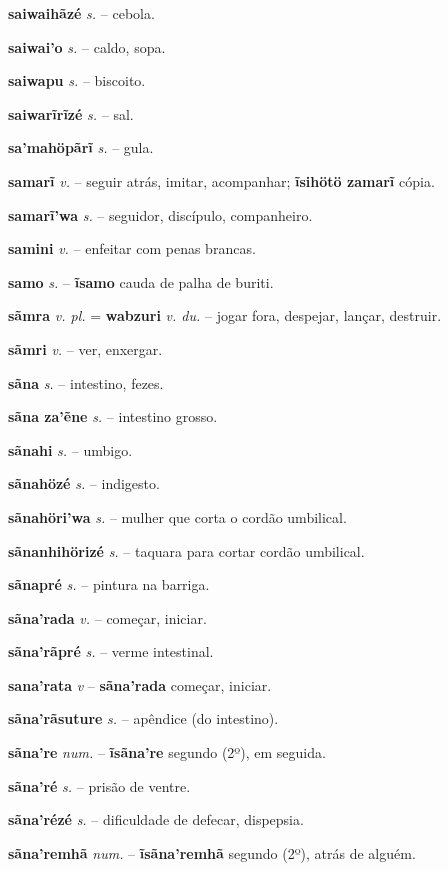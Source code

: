 \textbf{saiwaihãzé} \textit{s.} -- cebola.

\textbf{saiwai'o} \textit{s.} -- caldo, sopa.

\textbf{saiwapu} \textit{s.} -- biscoito.

\textbf{saiwarĩrĩzé} \textit{s.} -- sal.

\textbf{sa'mahöpãrĩ} \textit{s.} -- gula.

\textbf{samarĩ} \textit{v.} -- seguir atrás, imitar, acompanhar; \textbf{ĩsihötö zamarĩ} cópia.

\textbf{samarĩ'wa} \textit{s.} -- seguidor, discípulo, companheiro.

\textbf{samini} \textit{v.} -- enfeitar com penas brancas.

\textbf{samo} \textit{s.} -- \textbf{ĩsamo} cauda de palha de buriti.

\textbf{sãmra} \textit{v. pl.} = \textbf{wabzuri} \textit{v. du.} -- jogar fora, despejar, lançar, destruir.

\textbf{sãmri} \textit{v.} -- ver, enxergar.

\textbf{sãna} \textit{s.} -- intestino, fezes.

\textbf{sãna za'ẽne} \textit{s.} -- intestino grosso.

\textbf{sãnahi} \textit{s.} -- umbigo.

\textbf{sãnahözé} \textit{s.} -- indigesto.

\textbf{sãnahöri'wa} \textit{s.} -- mulher que corta o cordão umbilical.

\textbf{sãnanhihörizé} \textit{s.} -- taquara para cortar cordão umbilical.

\textbf{sãnapré} \textit{s.} -- pintura na barriga.

\textbf{sãna'rada} \textit{v.} -- começar, iniciar.

\textbf{sãna'rãpré} \textit{s.} -- verme intestinal.

\textbf{sana'rata} \textit{v} -- \textbf{sãna'rada} começar, iniciar.

\textbf{sãna'rãsuture} \textit{s.} -- apêndice (do intestino).

\textbf{sãna're} \textit{num.} -- \textbf{ĩsãna're} segundo (2º), em seguida.

\textbf{sãna'ré} \textit{s.} -- prisão de ventre.

\textbf{sãna'rézé} \textit{s.} -- dificuldade de defecar, dispepsia.

\textbf{sãna'remhã} \textit{num.} -- \textbf{ĩsãna'remhã} segundo (2º), atrás de alguém.

